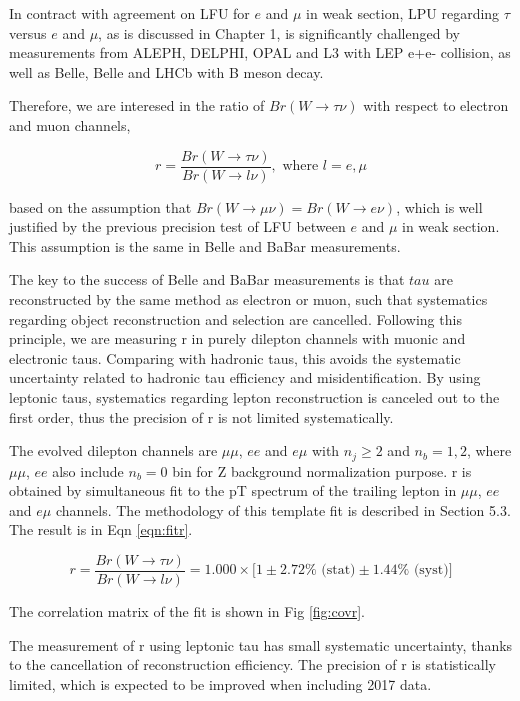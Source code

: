% 

In contract with agreement on LFU for $e$ and $\mu$ in weak section, LPU 
regarding $\tau$ versus $e$ and $\mu$, as is discussed in Chapter 1, 
is significantly challenged by 
measurements from ALEPH, DELPHI, OPAL and L3 with LEP e+e- collision, 
as well as Belle, Belle and LHCb with B meson decay.


Therefore, we are interesed in the ratio of $Br (W\to \tau \nu)$ with respect to electron
and muon channels,

\begin{equation}
    r = \frac{Br (W\to \tau \nu)}{Br (W\to l \nu)} , \text{ where } l=e,\mu
\end{equation}

based on the assumption that $Br (W\to \mu \nu) = Br( W\to e \nu )$, which
is well justified by the previous precision test of LFU between $e$ and $\mu$ in weak section.
This assumption is the same in Belle and BaBar measurements.

The key to the success of Belle and BaBar measurements is that $tau$ are reconstructed
by the same method as electron or muon, such that systematics regarding object
reconstruction and selection are cancelled.
Following this principle, we are measuring r in purely dilepton channels with muonic and electronic taus.
Comparing with hadronic taus, this avoids the systematic uncertainty related to hadronic tau efficiency
and misidentification.
By using leptonic taus, systematics regarding lepton reconstruction 
is canceled out to the first order, thus the precision of r is not limited systematically.

The evolved dilepton channels are $\mu\mu$, $ee$ and $e\mu$ with $n_j \geq 2$ and $n_b = 1,2$,
where $\mu\mu$, $ee$ also include $n_b = 0$ bin for Z background normalization purpose.
r is obtained by simultaneous fit to the pT spectrum of the trailing lepton in $\mu\mu$,
$ee$ and $e\mu$ channels. The methodology of this template fit is described in Section 5.3.
The result is in Eqn \ref{eqn:fitr}.

\begin{equation}
    \boxed{
    r = \frac{Br (W\to \tau \nu)}{Br (W\to l \nu)}
    = 1.000 \times \big[1 \pm 2.72\% \text{ (stat)} \pm 1.44\% \text{ (syst)} \big]
    }
    \label{eqn:fitr}
\end{equation}

The correlation matrix of the fit is shown in Fig \ref{fig:covr}.

The measurement of r using leptonic tau has small systematic uncertainty, thanks to the 
cancellation of reconstruction efficiency. The precision of r is statistically limited, 
which is expected to be improved when including 2017 data.


